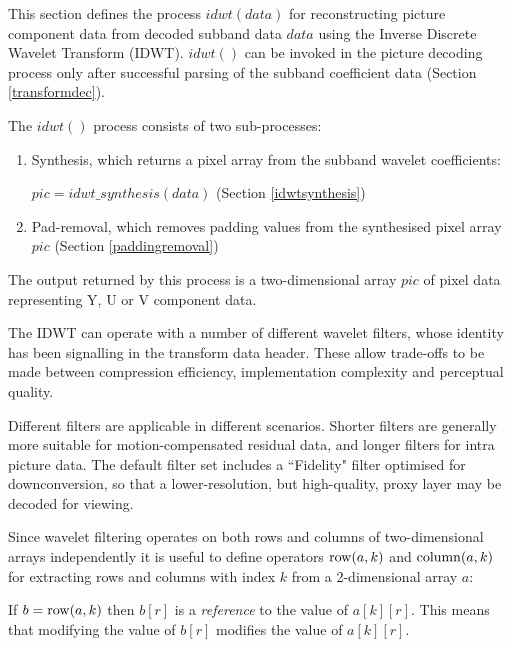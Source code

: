
\label{idwt}

This section defines the process $idwt(data)$ for reconstructing picture component data
from decoded subband data $data$ using the Inverse Discrete Wavelet Transform (IDWT). $idwt()$
can be invoked in the picture decoding process only after successful parsing of the
subband coefficient data (Section \ref{transformdec}).

The $idwt()$ process consists of two sub-processes:

\begin{enumerate}
\item Synthesis, which returns a pixel array from the subband wavelet
coefficients: 

$pic=idwt\_synthesis(data)$ (Section \ref{idwtsynthesis})
\item Pad-removal, which removes padding values from the synthesised pixel array $pic$ (Section \ref{paddingremoval})
\end{enumerate}

The output returned by this process is a two-dimensional array $pic$ of pixel data representing
Y, U or V component data.

\begin{informative}
The IDWT can operate with a number of different wavelet filters, whose identity has
been signalling in the transform data header. These allow trade-offs to be made
between compression efficiency, implementation complexity and perceptual quality.

Different filters are applicable in different scenarios. Shorter filters are generally more
suitable for motion-compensated residual data, and longer filters for intra picture data.
The default filter set includes a ``Fidelity" filter optimised for downconversion, so that a lower-resolution,
but high-quality, proxy layer may be decoded for viewing.
\end{informative}

Since wavelet filtering operates on both rows and columns of two-dimensional arrays independently
it is useful to define operators $\operatorname{row}(a,k)$ and $\operatorname{column}(a,k)$ for extracting rows and columns
with index $k$ from a 2-dimensional array $a$:

If $b=\operatorname{row}(a,k)$ then $b[r]$ is a {\em reference} to the value of $a[k][r]$. This means that modifying the
value of $b[r]$ modifies the value of $a[k][r]$.

